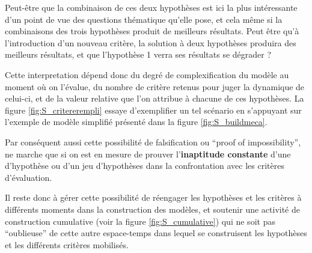 Peut-être que la combinaison de ces deux hypothèses est ici la plus intéressante d'un point de vue des questions thématique qu'elle pose, et cela même si la combinaisons des trois hypothèses produit de meilleurs résultats. Peut être qu'à l'introduction d'un nouveau critère, la solution à deux hypothèses produira des meilleurs résultats, et que l'hypothèse 1 verra ses résultats se dégrader ? 

Cette interpretation dépend donc du degré de complexification du modèle au moment où on l'évalue, du nombre de critère retenus pour juger la dynamique de celui-ci, et de la valeur relative que l'on attribue à chacune de ces hypothèses. La figure \ref{fig:S_critererempli} essaye d'exemplifier un tel scénario en s'appuyant sur l'exemple de modèle simplifié présenté dans la figure \ref{fig:S_buildmeca}.

Par conséquent aussi cette possibilité de falsification ou \foreignquote{english}{proof of impossibility}, ne marche que si on est en mesure de prouver l'\textbf{inaptitude constante} d'une d'hypothèse ou d'un jeu d'hypothèses dans la confrontation avec les critères d’évaluation.

Il reste donc à gérer cette possibilité de réengager les hypothèses et les critères à différents moments dans la construction des modèles, et soutenir une activité de construction cumulative (voir la figure \ref{fig:S_cumulative}) qui ne soit pas \enquote{oublieuse} de cette autre espace-temps dans lequel se construisent les hypothèses et les différents critères mobilisés. 

